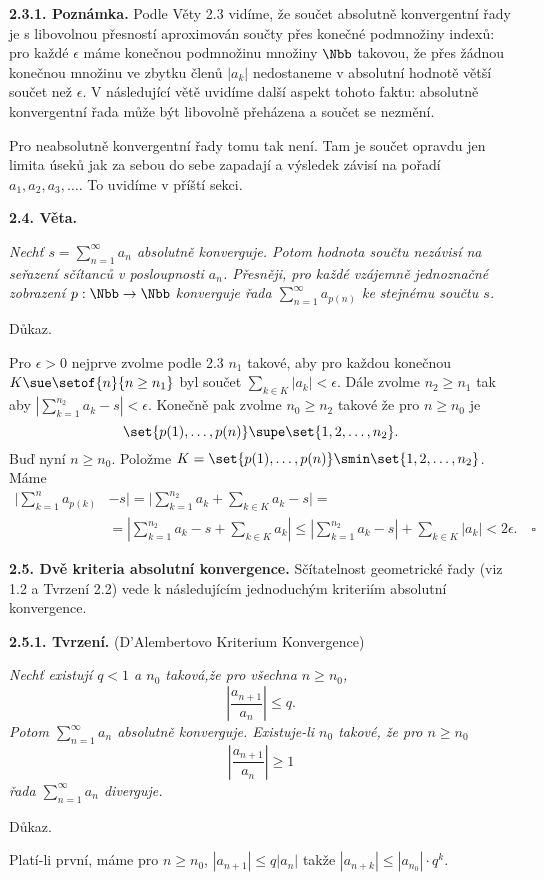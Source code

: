 \documentclass[12pt]{article}
\begin{document}
 \medskip
 
 {\bf 2.3.1. Poznámka.} Podle Věty 2.3 vidíme, že součet absolutně konvergentní řady je s libovolnou přesností
 aproximován součty přes konečné podmnožiny indexů: pro každé $\epsilon$ máme konečnou podmnožinu množiny $\Nbb$ takovou, že přes žádnou konečnou množinu ve zbytku členů $|a_k|$ nedostaneme v absolutní hodnotě větší součet než  $\epsilon$. V následující větě uvidíme další aspekt tohoto faktu:  absolutně konvergentní řada může být libovolně přeházena a součet se nezmění.
 
Pro neabsolutně konvergentní řady tomu tak není. Tam je součet opravdu jen limita \'useků jak za sebou do sebe zapadají a výsledek závisí na pořadí  $a_1,a_2,a_3,\dots$. To uvidíme v příští sekci. 
 
 \bigskip
 
 {\bf 2.4. Věta.} {\em Nechť $s=\sum_{n=1}^\infty a_n$ absolutně konverguje. Potom hodnota součtu nezávisí na  seřazení sčítanců v posloupnosti $a_n$.  Přesněji, pro každé vzájemně jednoznačné zobrazení $p:\Nbb\to\Nbb$ konverguje řada
 $\sum_{n=1}^\infty a_{p(n)}$ ke stejnému součtu $s$.
 
 Důkaz.} Pro $\epsilon>0$ nejprve zvolme podle  2.3  $n_1$ takové, aby pro každou konečnou
  $K\sue \setof{n}{n\geq n_1}$ byl součet $\sum_{k\in K}|a_k|<\epsilon$. Dále zvolme $n_2\geq n_1$ tak aby
 $|\sum_{k=1}^{n_2}a_k-s|<\epsilon$. Konečně pak zvolme $n_0\geq n_2$ takové že pro $n\geq n_0$ je
 $$
 \set{p(1),\dots,p(n)}\supe\set{1,2,\dots,n_2}.
 $$
Buď nyní $n\geq n_0$. Položme $K=\set{p(1),\dots,p(n)}\smin\set{1,2,\dots,n_2}$. Máme
 $$
 \begin{aligned}
 |\sum_{k=1}^{n}a_{p(k)}&-s|=|\sum_{k=1}^{n_2}a_k + \sum_{k\in K}a_k-s|=\\
 &= |\sum_{k=1}^{n_2}a_k-s+\sum_{k\in K}a_k|\leq |\sum_{k=1}^{n_2}a_k-s|+\sum_{k\in K}|a_k|<2\epsilon. \quad\square
 \end{aligned}
 $$
 
 \bigskip
 
 {\bf 2.5. Dvě kriteria absolutní konvergence.} Sčítatelnost geometrické řady (viz 1.2 a Tvrzení 2.2) vede k následujícím jednoduchým kriteriím absolutní konvergence.
 
 \medskip
 
 {\bf 2.5.1. Tvrzení.} (D'Alembertovo Kriterium Konvergence) {\em Nechť existují $q<1$ a $n_0$ taková,že pro všechna $n\geq n_0$,
 $$
 \left|\frac{a_{n+1}}{a_n}\right|\leq q.
 $$
 Potom $\sum_{n=1}^\infty a_n$ absolutně konverguje. Existuje-li $n_0$ takové, že pro $n\geq n_0$ 
 $$
 \left|\frac{a_{n+1}}{a_n}\right|\geq 1 
 $$
řada $\sum_{n=1}^\infty a_n$ diverguje.
 
 Důkaz.} Platí-li první, máme pro $n\geq n_0$, $|a_{n+1}| \leq q|a_n|$ takže
 $|a_{n+k}|\leq |a_{n_0}|\cdot q^k$.
 
\end{document}
